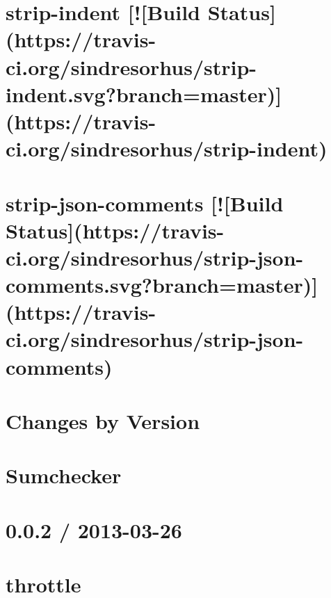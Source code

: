 \documentclass[twoside]{book}
\newcommand{\+}{\discretionary{\mbox{\scriptsize$\hookleftarrow$}}{}{}}
\begin{document}
\chapter{strip-\/indent \mbox{[}!\mbox{[}Build Status\mbox{]}(https\+://travis-\/ci.org/sindresorhus/strip-\/indent.svg?branch=master)\mbox{]}(https\+://travis-\/ci.org/sindresorhus/strip-\/indent)}
\label{md_dsmacc_vis_degree_node_modules_strip-indent_readme}

\chapter{strip-\/json-\/comments \mbox{[}!\mbox{[}Build Status\mbox{]}(https\+://travis-\/ci.org/sindresorhus/strip-\/json-\/comments.svg?branch=master)\mbox{]}(https\+://travis-\/ci.org/sindresorhus/strip-\/json-\/comments)}
\label{md_dsmacc_vis_degree_node_modules_strip-json-comments_readme}

\chapter{Changes by Version}
\label{md_dsmacc_vis_degree_node_modules_sumchecker_NEWS}

\chapter{Sumchecker}
\label{md_dsmacc_vis_degree_node_modules_sumchecker_README}

\chapter{0.0.2 / 2013-\/03-\/26}
\label{md_dsmacc_vis_degree_node_modules_throttleit_History}

\chapter{throttle}
\label{md_dsmacc_vis_degree_node_modules_throttleit_Readme}

\end{document}

